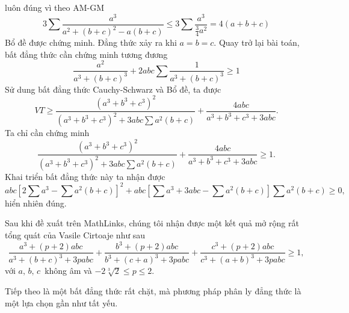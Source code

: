 \begin{bt}
{\begin{displaymath}
\end{displaymath}
luôn đúng vì theo AM-GM
\begin{displaymath}
3\sum \dfrac{a^3}{a^2+\left(b+c\right)^2-a\left(b+c\right)}\leq 3\sum \dfrac{a^3}{\frac{3}{4}a^2}=4\left(a+b+c\right)
\end{displaymath}
Bổ đề được chứng minh. Đẳng thức xảy ra khi $a=b=c$. Quay trở lại bài toán, bất đẳng thức cần chứng minh tương đương
\begin{displaymath}
\dfrac{a^2}{a^3+\left(b+c\right)^3}+2abc\sum \dfrac{1}{a^3+\left(b+c\right)^3}\geq 1
\end{displaymath}
Sử dung bất đẳng thức Cauchy-Schwarz và Bổ đề, ta được
\begin{displaymath}
VT\geq \dfrac{\left(a^3+b^3+c^3\right)^2}{\left(a^3+b^3+c^3\right)^2+3abc\sum a^2\left(b+c\right)}+\dfrac{4abc}{a^3+b^3+c^3+3abc}.
\end{displaymath}
Ta chỉ cần chứng minh
\[\dfrac{\left(a^3+b^3+c^3\right)^2}{\left(a^3+b^3+c^3\right)^2+3abc\sum a^2\left(b+c\right)}+\dfrac{4abc}{a^3+b^3+c^3+3abc}\geq 1.\]
Khai triển bất đẳng thức này ta nhận được
\begin{displaymath}
abc\left[2\sum a^3-\sum a^2\left(b+c\right)\right]^2+abc\left[\sum a^3+3abc-\sum a^2\left(b+c\right)\right]\sum a^2\left(b+c\right)\geq 0,
\end{displaymath}
hiển nhiên đúng.
}

\begin{nx}
Sau khi đề xuất trên MathLinks, chúng tôi nhận được một kết quả mở rộng rất tổng quát của Vasile Cirtoaje như sau
\begin{displaymath}
\dfrac{a^3+\left(p+2\right)abc}{a^3+\left(b+c\right)^3+3pabc}+\dfrac{b^3+\left(p+2\right)abc}{b^3+\left(c+a\right)^3+3pabc}+\dfrac{c^3+\left(p+2\right)abc}{c^3+\left(a+b\right)^3+3pabc}\geq 1,
\end{displaymath}
với $a,\,b,\,c\,$ không âm và $-2\sqrt[3]{2}\leq p \leq 2$.
\end{nx}
\end{bt}
Tiếp theo là một bất đẳng thức rất chặt, mà phương pháp phân ly đẳng thức là một lựa chọn gần như tất yếu.

